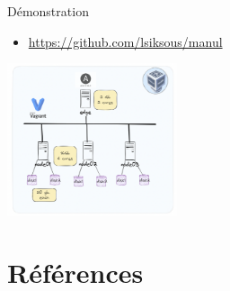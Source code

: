 \documentclass[tiny]{beamer}
\begin{document}
\begin{frame}[label={sec:org90675cd}]{Démonstration}
\begin{itemize}
\item \url{https://github.com/lsiksous/manul}
\end{itemize}

\begin{center}
\includegraphics[width=5cm]{../../media/topo.png}
\end{center}
\end{frame}


\section{Références}
\label{sec:org09caa15}
\listoffigures



\end{document}
